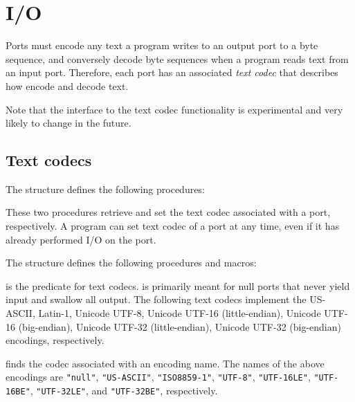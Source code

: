 \section{I/O}

Ports must encode any text a program writes to an output port to a
byte sequence, and conversely decode byte sequences when a program
reads text from an input port.  Therefore, each port has an associated
\textit{text codec} that describes how encode and decode text.

Note that the interface to the text codec functionality is
experimental and very likely to change in the future.

\subsection{Text codecs}

The  structure defines the following procedures:
%
\begin{protos}
\end{protos}
%
These two procedures retrieve and set the text codec associated with a
port, respectively.  A program can set text codec of a port at any
time, even if it has already performed I/O on the port.

The  structure defines the following procedures and macros:

\begin{protos}
\end{protos}
%
 is the predicate for text codecs.
 is primarily meant for null ports that never
yield input and swallow all output.  The following text codecs
implement the US-ASCII, Latin-1, Unicode UTF-8, Unicode UTF-16
(little-endian), Unicode UTF-16 (big-endian), Unicode UTF-32
(little-endian), Unicode UTF-32 (big-endian) encodings, respectively.

 finds the codec associated with an encoding
name.  The names of the above encodings are \verb|"null"|,
\verb|"US-ASCII"|, \verb|"ISO8859-1"|, \verb|"UTF-8"|,
\verb|"UTF-16LE"|, \verb|"UTF-16BE"|, \verb|"UTF-32LE"|, and
\verb|"UTF-32BE"|, respectively.

